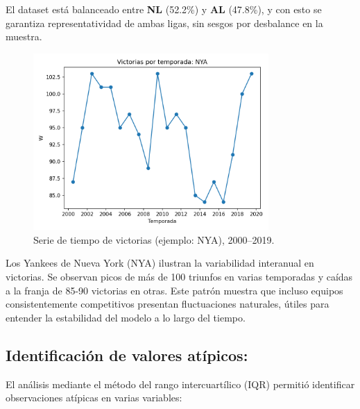 \documentclass[man,floatsintext]{apa7}
\begin{document}
El dataset está balanceado entre \textbf{NL} (52.2\%) y \textbf{AL} (47.8\%), y con esto se garantiza representatividad de ambas ligas, sin sesgos por desbalance en la muestra.

\begin{figure}[H]
    \centering
    \includegraphics[width=0.8\textwidth]{../plots/ts_W_NYA.png}
    \caption{Serie de tiempo de victorias (ejemplo: NYA), 2000--2019.}
\end{figure}

Los Yankees de Nueva York (NYA) ilustran la variabilidad interanual en victorias. 
Se observan picos de más de 100 triunfos en varias temporadas y caídas a la franja de 85-90 victorias en otras. 
Este patrón muestra que incluso equipos consistentemente competitivos presentan fluctuaciones naturales, útiles para entender la estabilidad del modelo a lo largo del tiempo.

\subsection{Identificación de valores atípicos:}

El análisis mediante el método del rango intercuartílico (IQR) permitió identificar observaciones atípicas en varias variables:
\end{document}
